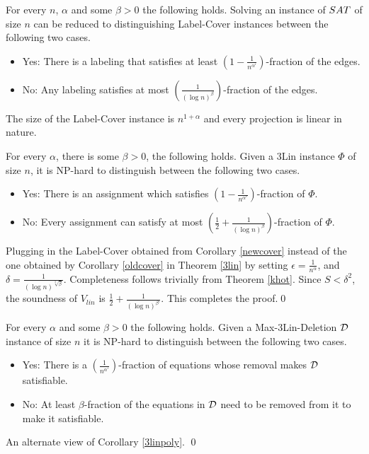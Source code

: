 \begin{corollary} \label{newcover}
  For every $n$, $\alpha$ and some $\beta > 0$ the following
  holds. Solving an instance of ${\sc SAT}$ of size $n$ can be reduced
  to distinguishing {\sc Label-Cover} instances 
  between the following two cases.
\begin{itemize}
\item {\sf Yes:} There is a labeling that satisfies at least $(1 -
		\frac{1}{n^{\alpha'}})$-fraction of the edges.
\item {\sf No:} Any labeling satisfies at most $(\frac{1}{(\log n)^\beta})$-fraction of the edges.
\end{itemize}
The size of the {\sc Label-Cover} instance is $n^{1 + \alpha}$ and every projection is linear in nature.
\end{corollary}

\begin{corollary} \label{3linpoly} For every
  $\alpha$, there is some $\beta > 0$, the following holds. Given a
  {\sc 3Lin} instance $\Phi$ of size $n$, it is {\sf NP}-hard to
  distinguish between the following two cases.
\begin{itemize}
\item {\sf Yes:} There is an assignment which satisfies $(1 -
		\frac{1}{n^{\alpha'}})$-fraction of $\Phi$.
\item {\sf No:} Every assignment can satisfy at most $(\frac{1}{2} +
    \frac{1}{(\log n)^{\beta}})$-fraction of $\Phi$.
\end{itemize}
\end{corollary}
 Plugging in the {\sc Label-Cover} obtained from
Corollary \ref{newcover} instead of the one obtained by Corollary
\ref{oldcover} in Theorem \ref{3lin} by setting 
$\epsilon = \frac{1}{n^\alpha}$, and $\delta = \frac{1}{(\log
n)^{\sqrt[3]{\beta}}}$.  Completeness follows trivially from Theorem
\ref{khot}. Since $S < \delta^2$, the soundness of $V_{lin}$ is $\frac{1}{2} +
\frac{1}{(\log n)^{\beta'}}$. This completes the proof.\qed

\begin{corollary} \label{3delpoly}
  For every $\alpha$ and some $\beta > 0$ the following holds. Given a
  {\sc Max-3Lin-Deletion} ${\cal D}$ instance of size $n$ it is {\sf
    NP}-hard to distinguish between the following two cases.
\begin{itemize}
\item {\sf Yes:} There is a $(\frac{1}{n^{\alpha'}})$-fraction of
  equations whose removal makes ${\cal D}$ satisfiable.
\item {\sf No:} At least $\beta$-fraction of the equations in ${\cal
    D}$ need to be removed from it to make it satisfiable.
\end{itemize}
\end{corollary}
 An alternate view of Corollary \ref{3linpoly}. \qed \\

